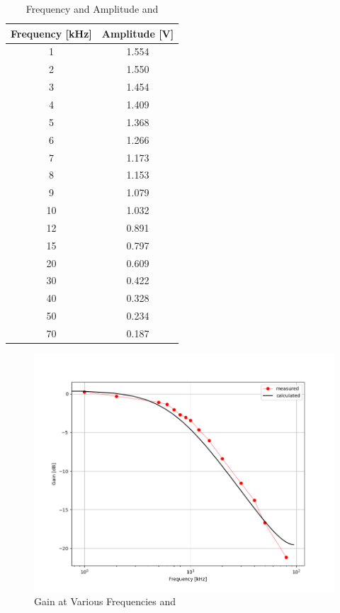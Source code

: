 \begin{table}[H]
    \centering
    \begin{tabular}{cc}
        \hline
        \textbf{Frequency [kHz]} & \textbf{Amplitude [V]} \\
        \hline
        1   & 1.554 \\
        2   & 1.550 \\
        3   & 1.454 \\
        4   & 1.409 \\
        5   & 1.368 \\
        6   & 1.266 \\
        7   & 1.173 \\
        8   & 1.153 \\
        9   & 1.079 \\
        10  & 1.032 \\
        12  & 0.891 \\
        15  & 0.797 \\
        20  & 0.609 \\
        30  & 0.422 \\
        40  & 0.328 \\
        50  & 0.234 \\
        70  & 0.187 \\
        \hline
    \end{tabular}
    \caption{Frequency and Amplitude  and }
    \label{tab:freq_mag_data}
\end{table}

\begin{figure}[H]
    \centering
    \includegraphics[width=150mm, keepaspectratio]{figures/bode02001.png}
    \caption{Gain at Various Frequencies  and }
    \label{fig:bode02001}
\end{figure}

